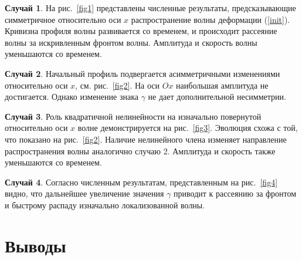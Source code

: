 \textbf {Случай 1}. На рис.~\ref {fig1} представлены численные результаты, предсказывающие симметричное относительно оси $ x $  распространение волны деформации (\ref {init}). Кривизна профиля волны развивается со временем, и происходит рассеяние волны за искривленным фронтом волны. Амплитуда и скорость волны уменьшаются со временем.

\textbf {Случай 2}. Начальный профиль подвергается асимметричными изменениями относительно оси $ x $, см. рис.~\ref{fig2}. На оси $ Ox $ наибольшая амплитуда не достигается. Однако изменение знака $ \gamma $ не дает дополнительной несимметрии.

\textbf {Случай 3}. Роль квадратичной нелинейности на изначально повернутой относительно оси $x$ волне демонстрируется на рис.~\ref{fig3}. Эволюция схожа с той, что показано на рис.~\ref {fig2}. Наличие нелинейного члена изменяет направление распространения волны аналогично случаю 2. Амплитуда и скорость также уменьшаются со временем.

\textbf {Случай 4}. Согласно численным результатам, представленным на рис.~\ref {fig4} видно, что дальнейшее увеличение значения $ \gamma $ приводит к рассеянию за фронтом и быстрому распаду изначально локализованной волны.


\section{Выводы}



